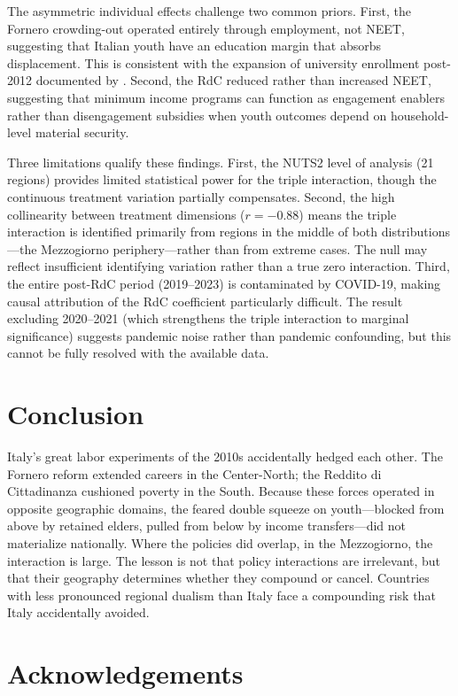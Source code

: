 \documentclass[12pt]{article}
\begin{document}
The asymmetric individual effects challenge two common priors. First, the Fornero crowding-out operated entirely through employment, not NEET, suggesting that Italian youth have an education margin that absorbs displacement. This is consistent with the expansion of university enrollment post-2012 documented by \citet{ferrante2023}. Second, the RdC reduced rather than increased NEET, suggesting that minimum income programs can function as engagement enablers rather than disengagement subsidies when youth outcomes depend on household-level material security.

Three limitations qualify these findings. First, the NUTS2 level of analysis (21 regions) provides limited statistical power for the triple interaction, though the continuous treatment variation partially compensates. Second, the high collinearity between treatment dimensions ($r = -0.88$) means the triple interaction is identified primarily from regions in the middle of both distributions---the Mezzogiorno periphery---rather than from extreme cases. The null may reflect insufficient identifying variation rather than a true zero interaction. Third, the entire post-RdC period (2019--2023) is contaminated by COVID-19, making causal attribution of the RdC coefficient particularly difficult. The result excluding 2020--2021 (which strengthens the triple interaction to marginal significance) suggests pandemic noise rather than pandemic confounding, but this cannot be fully resolved with the available data.


\section{Conclusion}

Italy's great labor experiments of the 2010s accidentally hedged each other. The Fornero reform extended careers in the Center-North; the Reddito di Cittadinanza cushioned poverty in the South. Because these forces operated in opposite geographic domains, the feared double squeeze on youth---blocked from above by retained elders, pulled from below by income transfers---did not materialize nationally. Where the policies did overlap, in the Mezzogiorno, the interaction is large. The lesson is not that policy interactions are irrelevant, but that their geography determines whether they compound or cancel. Countries with less pronounced regional dualism than Italy face a compounding risk that Italy accidentally avoided.

\section*{Acknowledgements}
\end{document}
